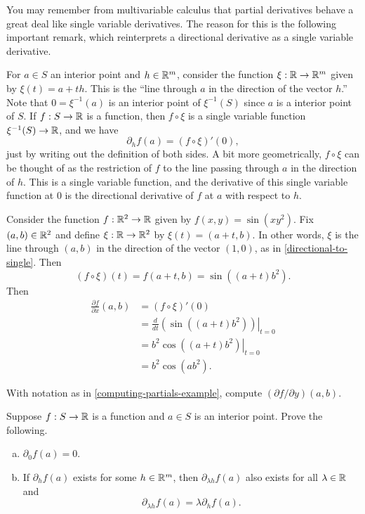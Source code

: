 You may remember from multivariable calculus that partial derivatives behave a great deal like single variable derivatives. The reason for this is the following important remark, which reinterprets a directional derivative as a single variable derivative. 

\begin{remark} \label{directional-to-single}
	For $a \in S$ an interior point and $h \in \mathbb{R}^m$, consider the function $\xi : \mathbb{R} \to \mathbb{R}^m$ given by $\xi(t) = a + th$. This is the ``line through $a$ in the direction of the vector $h$.'' Note that $0 = \xi^{-1}(a)$ is an interior point of $\xi^{-1}(S)$ since $a$ is a interior point of $S$. If $f : S \to \mathbb{R}$ is a function, then $f \circ \xi$ is a single variable function $\xi^{-1}(S) \to \mathbb{R}$, and we have
	\[ \partial_h f(a) = (f \circ \xi)'(0), \]
	just by writing out the definition of both sides. A bit more geometrically, $f \circ \xi$ can be thought of as the restriction of $f$ to the line passing through $a$ in the direction of $h$. This is a single variable function, and the derivative of this single variable function at 0 is the directional derivative of $f$ at $a$ with respect to $h$. 
\end{remark}

\begin{example} \label{computing-partials-example}
	Consider the function $f : \mathbb{R}^2 \to \mathbb{R}$ given by $f(x, y) = \sin(xy^2)$. Fix $(a, b) \in \mathbb{R}^2$ and define $\xi : \mathbb{R} \to \mathbb{R}^2$ by $\xi(t) = (a + t, b)$. In other words, $\xi$ is the line through $(a, b)$ in the direction of the vector $(1,0)$, as in \cref{directional-to-single}. Then
	\[ (f \circ \xi)(t) = f(a + t, b) = \sin((a+t)b^2).  \]
	Then
	\[ \begin{aligned} \frac{\partial f}{\partial x}(a, b) &= (f \circ \xi)'(0) \\
	&= \left.\frac{d}{dt} \left(\sin((a+t)b^2) \right) \right|_{t = 0} \\
	&= \left. b^2\cos((a+t)b^2)\right|_{t = 0} \\
	&= b^2\cos(ab^2). \end{aligned}  \]
\end{example}

\begin{exercise}
	With notation as in \cref{computing-partials-example}, compute $(\partial f/\partial y)(a, b)$. 
\end{exercise}

\begin{exercise} \label{basic-directional-derivative-properties}
	Suppose $f : S \to \mathbb{R}$ is a function and $a \in S$ is an interior point. Prove the following. 
	\begin{enumerate}[(a)]
		\item $\partial_0 f(a) = 0$.  
		\item If $\partial_h f(a)$ exists for some $h \in \mathbb{R}^m$, then $\partial_{\lambda h} f(a)$ also exists for all $\lambda \in \mathbb{R}$ and \[ \partial_{\lambda h} f(a) = \lambda \partial_h f(a). \] 
	\end{enumerate}
\end{exercise}


